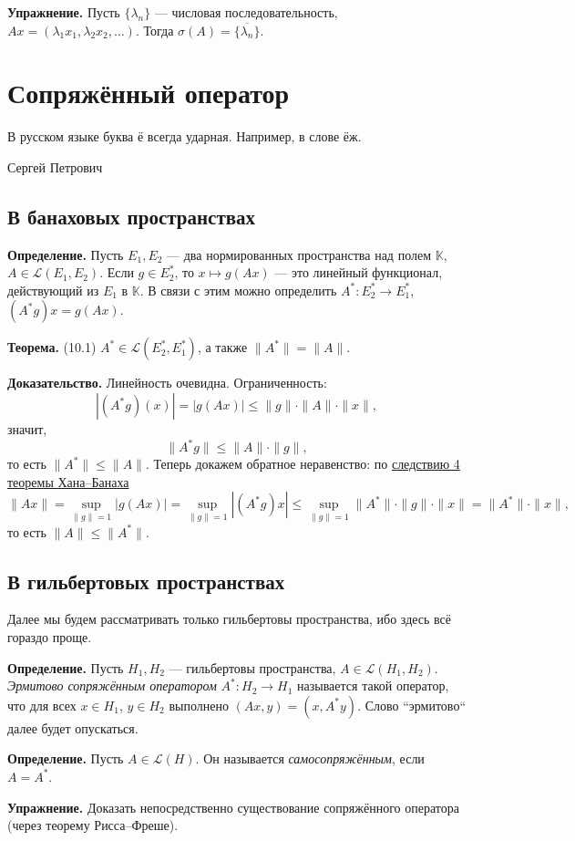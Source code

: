 \textbf{Упражнение.} Пусть $\{\lambda_n\}$ --- числовая последовательность, $Ax = (\lambda_1 x_1, \lambda_2 x_2, \dots)$.
Тогда $\sigma(A) = \overline{\{\lambda_n\}}$.

\section{Сопряжённый оператор}
\epigraph{В русском языке буква ё всегда ударная. Например, в слове ёж.}{Сергей Петрович}
\subsection{В банаховых пространствах}
\textbf{Определение.} Пусть $E_1, E_2$ --- два нормированных пространства над полем $\mathbb K$, $A \in \mathcal L(E_1, E_2)$.
Если $g \in E_2^*$, то $x \mapsto g(Ax)$ --- это линейный функционал, действующий из $E_1$ в $\mathbb K$.
В связи с этим можно определить $A^*: E_2^* \to E_1^*$, $(A^* g) x = g(Ax)$.

\label{th:10-1} \textbf{Теорема.} (10.1) $A^* \in \mathcal L(E_2^*, E_1^*)$, а также $\|A^*\| = \|A\|$.

\textbf{Доказательство.} Линейность очевидна.
Ограниченность:
\[
    |(A^* g)(x)| = |g(Ax)| \le \|g\| \cdot \|A\| \cdot \|x\|,
\]
значит,
\[
    \|A^* g\| \le \|A\| \cdot \|g\|,
\]
то есть $\|A^*\| \le \|A\|$.
Теперь докажем обратное неравенство: по \hyperref[th:hahn-banach-coll-4]{следствию 4 теоремы Хана--Банаха}
\[
    \|Ax\| = \sup_{\|g\| = 1} |g(Ax)| = \sup_{\|g\| = 1} |(A^* g) x| \le \sup_{\|g\| = 1} \|A^*\| \cdot \|g\| \cdot \|x\| = \|A^*\| \cdot \|x\|,
\]
то есть $\|A\| \le \|A^*\|$.

\QED

\subsection{В гильбертовых пространствах}
Далее мы будем рассматривать только гильбертовы пространства, ибо здесь всё гораздо проще.

\textbf{Определение.} Пусть $H_1, H_2$ --- гильбертовы пространства, $A \in \mathcal L(H_1, H_2)$.
\textit{Эрмитово сопряжённым оператором} $A^*: H_2 \to H_1$ называется такой оператор, что для всех $x \in H_1$, $y \in H_2$ выполнено $(Ax, y) = (x, A^* y)$.
Слово ``эрмитово`` далее будет опускаться.

\textbf{Определение.} Пусть $A \in \mathcal L(H)$.
Он называется \textit{самосопряжённым}, если $A = A^*$.

\textbf{Упражнение.} Доказать непосредственно существование сопряжённого оператора (через теорему Рисса--Фреше).


